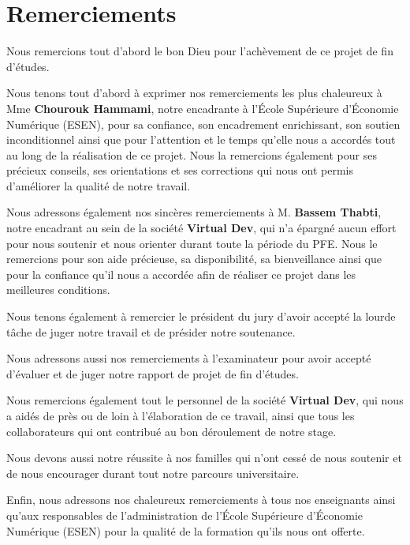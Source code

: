 \chapter*{Remerciements}

Nous remercions tout d’abord le bon Dieu pour l’achèvement de ce projet de fin d’études.

Nous tenons tout d’abord à exprimer nos remerciements les plus chaleureux à Mme \textbf{Chourouk Hammami}, notre encadrante à l’École Supérieure d’Économie Numérique (ESEN), pour sa confiance, son encadrement enrichissant, son soutien inconditionnel ainsi que pour l’attention et le temps qu’elle nous a accordés tout au long de la réalisation de ce projet. Nous la remercions également pour ses précieux conseils, ses orientations et ses corrections qui nous ont permis d’améliorer la qualité de notre travail.

Nous adressons également nos sincères remerciements à M. \textbf{Bassem Thabti}, notre encadrant au sein de la société \textbf{Virtual Dev}, qui n’a épargné aucun effort pour nous soutenir et nous orienter durant toute la période du PFE. Nous le remercions pour son aide précieuse, sa disponibilité, sa bienveillance ainsi que pour la confiance qu’il nous a accordée afin de réaliser ce projet dans les meilleures conditions.

Nous tenons également à remercier le président du jury d’avoir accepté la lourde tâche de juger notre travail et de présider notre soutenance.

Nous adressons aussi nos remerciements à l’examinateur pour avoir accepté d’évaluer et de juger notre rapport de projet de fin d’études.

Nous remercions également tout le personnel de la société \textbf{Virtual Dev}, qui nous a aidés de près ou de loin à l’élaboration de ce travail, ainsi que tous les collaborateurs qui ont contribué au bon déroulement de notre stage.

Nous devons aussi notre réussite à nos familles qui n’ont cessé de nous soutenir et de nous encourager durant tout notre parcours universitaire.

Enfin, nous adressons nos chaleureux remerciements à tous nos enseignants ainsi qu’aux responsables de l’administration de l’École Supérieure d’Économie Numérique (ESEN) pour la qualité de la formation qu’ils nous ont offerte.